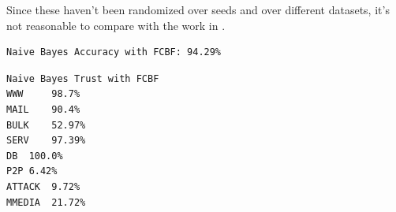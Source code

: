 \documentclass[a4paper,12pt]{article}
\begin{document}
Since these haven't been randomized over seeds and over different datasets, it's not reasonable to compare with the work in \cite{moore2005itc}.

\singlespacing
\begin{verbatim}
Naive Bayes Accuracy with FCBF: 94.29%
\end{verbatim}

\begin{verbatim}
Naive Bayes Trust with FCBF
WWW 	98.7%	 
MAIL	90.4%	 
BULK	52.97%	 
SERV	97.39%	 
DB	100.0%	 
P2P	6.42%	 
ATTACK	9.72%	 
MMEDIA	21.72%	 
\end{verbatim}
\doublespacing



\end{document}
